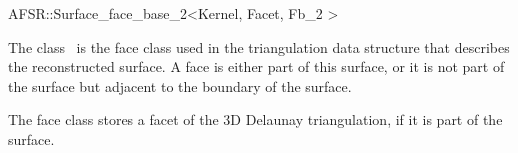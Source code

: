\begin{ccRefClass}{AFSR::Surface_face_base_2<Kernel, Facet, Fb_2 >}

\ccDefinition
  
The class \ccRefName\ is the face class used in the triangulation data structure 
that describes the reconstructed surface. A face is either part of this
surface, or it is not part of the surface but adjacent to the boundary of the surface. 

The face class stores a facet of the 3D Delaunay triangulation, if it
is part of the surface.





{}


\ccOperations





\end{ccRefClass}





